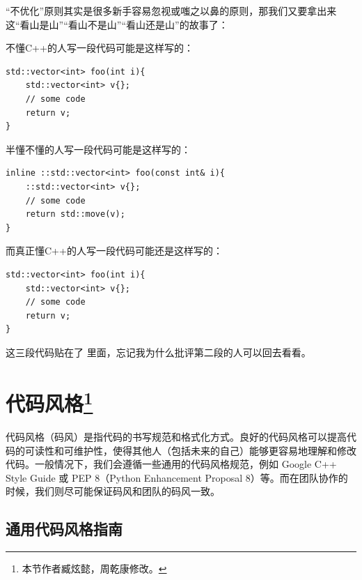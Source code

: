 “不优化”原则其实是很多新手容易忽视或嗤之以鼻的原则，那我们又要拿出来这“看山是山”“看山不是山”“看山还是山”的故事了：

不懂C++的人写一段代码可能是这样写的：
\begin{verbatim}
std::vector<int> foo(int i){
    std::vector<int> v{};
    // some code
    return v;
}
\end{verbatim}

半懂不懂的人写一段代码可能是这样写的：
\begin{verbatim}
inline ::std::vector<int> foo(const int& i){
    ::std::vector<int> v{};
    // some code
    return std::move(v);
}
\end{verbatim}

而真正懂C++的人写一段代码可能还是这样写的：
\begin{verbatim}
std::vector<int> foo(int i){
    std::vector<int> v{};
    // some code
    return v;
}
\end{verbatim}

这三段代码贴在了  里面，忘记我为什么批评第二段的人可以回去看看。

\section[代码风格]{代码风格\protect\footnote{本节作者臧炫懿，周乾康修改。}}\label{sec:code-style}

代码风格（码风）是指代码的书写规范和格式化方式。良好的代码风格可以提高代码的可读性和可维护性，使得其他人（包括未来的自己）能够更容易地理解和修改代码。一般情况下，我们会遵循一些通用的代码风格规范，例如 Google C++ Style Guide 或 PEP 8（Python Enhancement Proposal 8）等。而在团队协作的时候，我们则尽可能保证码风和团队的码风一致。

\subsection{通用代码风格指南}


